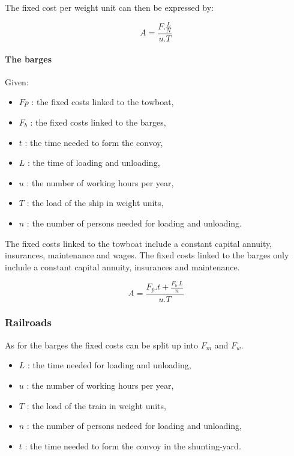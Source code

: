 The fixed cost per weight unit can then be expressed by:

$$A=\frac{F.\frac{L}{N}}{u.T}$$

\paragraph{The barges}

Given:

\begin{itemize}
\item $Fp$ : the fixed costs linked to the towboat,
\item $F_b$ : the fixed costs linked to the barges,
\item $t$ : the time needed to form the convoy,
\item $L$ : the time of loading and unloading,
\item $u$ : the number of working hours per year,
\item $T$ : the load of the ship in weight units,
\item $n$ : the number of persons needed for loading and unloading.
\end{itemize}

The fixed costs linked to the towboat include a constant capital annuity,
insurances, maintenance and wages.  The fixed costs linked to the barges only
include a constant capital annuity, insurances and maintenance.

$$A=\frac{F_p.t+\frac{F_b.L}{n}}{u.T}$$




\subsubsection{Railroads}


As for the barges the fixed costs can be split up into $F_m$ and $F_w$.

\begin{itemize}
\item $L$ : the time needed for loading and unloading,
\item $u$ : the number of working hours per year,
\item $T$ : the load of the train in weight units,
\item $n$ : the number of persons nedeed for loading and unloading,
\item $t$ : the time needed to form the convoy in the shunting-yard.
\end{itemize}


